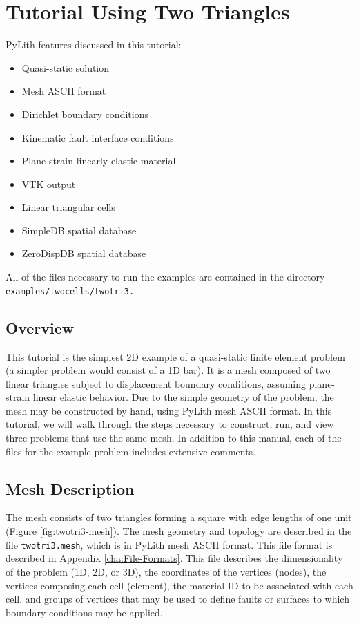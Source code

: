 
\section{\label{sec:Tutorial-Two-triangle}Tutorial Using Two Triangles}

PyLith features discussed in this tutorial:
\begin{itemize}
\item Quasi-static solution
\item Mesh ASCII format
\item Dirichlet boundary conditions
\item Kinematic fault interface conditions
\item Plane strain linearly elastic material
\item VTK output
\item Linear triangular cells
\item SimpleDB spatial database
\item ZeroDispDB spatial database
\end{itemize}
All of the files necessary to run the examples are contained in the
directory \texttt{examples/twocells/twotri3.}


\subsection{Overview}

This tutorial is the simplest 2D example of a quasi-static finite
element problem (a simpler problem would consist of a 1D bar). It
is a mesh composed of two linear triangles subject to displacement
boundary conditions, assuming plane-strain linear elastic behavior.
Due to the simple geometry of the problem, the mesh may be constructed
by hand, using PyLith mesh ASCII format. In this tutorial, we will
walk through the steps necessary to construct, run, and view three
problems that use the same mesh. In addition to this manual, each
of the files for the example problem includes extensive comments.


\subsection{Mesh Description}

The mesh consists of two triangles forming a square with edge lengths
of one unit (Figure \ref{fig:twotri3-mesh}). The mesh geometry and
topology are described in the file \texttt{twotri3.mesh}, which is
in PyLith mesh ASCII format. This file format is described in Appendix
\ref{cha:File-Formats}. This file describes the dimensionality of
the problem (1D, 2D, or 3D), the coordinates of the vertices (nodes),
the vertices composing each cell (element), the material ID to be
associated with each cell, and groups of vertices that may be used
to define faults or surfaces to which boundary conditions may be applied.


